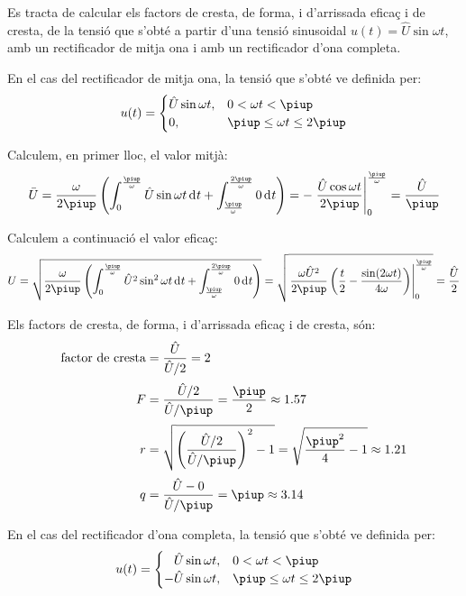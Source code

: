 \begin{exemple}[\FactorsCrestaFormaArr{}]
	\addcontentsxms{\FactorsCrestaFormaArr}
    Es tracta de calcular els factors de cresta, de forma, i d'arrissada eficaç i de cresta,
    de la tensió  que s'obté a partir d'una tensió sinusoidal
    $u(t) = \hat{U} \sin\omega t$, amb un rectificador de mitja ona i
    amb un rectificador d'ona completa.

    En el cas del rectificador de mitja ona, la tensió que s'obté ve
    definida per:
    \[
    u(t) = \begin{cases} \hat{U} \sin\omega t, & 0 < \omega t < \piup\\
           0, & \piup \leq \omega t \leq 2\piup \end{cases}
    \]

    Calculem, en primer lloc, el valor mitjà:
    \[
    \bar{U} = \frac{\omega}{2\piup} \left( \int_0^\frac{\piup}{\omega}
    \hat{U} \sin\omega t \diff t +
    \int_\frac{\piup}{\omega}^\frac{2\piup}{\omega} 0 \diff t \right) = -
    \left. \frac{\hat{U} \cos\omega t}{2\piup}
    \right|_0^\frac{\piup}{\omega} = \frac{\hat{U}}{\piup}
    \]

    Calculem a continuació el valor eficaç:
    \[
    U = \sqrt{\frac{\omega}{2\piup} \left( \int_0^\frac{\piup}{\omega}
    \hat{U}^2 \sin^2\omega t \diff t +
    \int_\frac{\piup}{\omega}^\frac{2\piup}{\omega} 0 \diff t \right)} =
      \sqrt{\left.\frac{\omega \hat{U}^2}{2\piup}\left( \frac{t}{2} -
    \frac{\sin (2\omega t)}{4\omega}
    \right)\right|_0^\frac{\piup}{\omega}} = \frac{\hat{U}}{2}
    \]

    Els factors de cresta, de forma, i d'arrissada eficaç i de cresta, són:
    \begin{align*}
        \text{factor de cresta} &= \frac{\hat{U}}{\hat{U}/2} = 2 \\[0.5ex]
        F &= \frac{\hat{U}/2}{\hat{U}/\piup} =\frac{\piup}{2} \approx
        \num{1,57} \\[0.5ex]
        r &= \sqrt{\left(\frac{\hat{U}/2}{\hat{U}/\piup}\right)^2-1} =
    \sqrt{\frac{\piup^2}{4}-1} \approx \num{1,21} \\[0.5ex]
        q &= \frac{\hat{U} - 0}{\hat{U}/\piup} = \piup \approx \num{3,14}
    \end{align*}


    En el cas del rectificador d'ona completa, la tensió que s'obté ve
    definida per:
    \[
    u(t) = \begin{cases} \phantom{-}\hat{U} \sin\omega t, & 0 < \omega t < \piup\\
           -\hat{U} \sin\omega t, & \piup \leq \omega t \leq 2\piup \end{cases}
    \]


\end{exemple}
